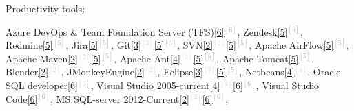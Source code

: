 \begin{cventries}
  \cventry
    {Productivity tools:} %
    {} %
    {} %
    {} %
    {
      \vspace{0.1cm}
      \begin{cvitems} %
        \item[] {        
        \textcolor{rainbowcolor-olive}{Azure DevOps \& Team Foundation Server (TFS)\textcolor{darkgray}{\textcolor{darkgray}{\ref{6}{$^{[6]}$}}}},
        \textcolor{rainbowcolor-olive}{Zendesk\textcolor{darkgray}{\ref{5}{$^{[5]}$}}},
        \textcolor{rainbowcolor-olive}{Redmine\textcolor{darkgray}{\ref{5}{$^{[5]}$}}},
        \textcolor{rainbowcolor-olive}{Jira\textcolor{darkgray}{\ref{5}{$^{[5]}$}}},   
        \textcolor{rainbowcolor-olive}{Git\textcolor{lightgray}{\ref{3}{$^{[3]}$}}\textcolor{darkgray}{\ref{5}{$^{[6]}$}}}, 
        \textcolor{rainbowcolor-olive}{SVN\textcolor{lightgray}{\ref{2}{$^{[2]}$}}\textcolor{darkgray}{\ref{5}{$^{[5]}$}}},
        \textcolor{rainbowcolor-olive}{Apache AirFlow\textcolor{darkgray}{\ref{5}{$^{[5]}$}}},
        \textcolor{rainbowcolor-olive}{Apache Maven\textcolor{lightgray}{\ref{2}{$^{[2]}$}}\textcolor{darkgray}{\ref{5}{$^{[5]}$}}},
        \textcolor{rainbowcolor-olive}{Apache Ant\textcolor{lightgray}{\ref{4}{$^{[4]}$}}\textcolor{darkgray}{\ref{5}{$^{[5]}$}}},  
        \textcolor{rainbowcolor-olive}{Apache Tomcat\textcolor{darkgray}{\ref{5}{$^{[5]}$}}}, 
        \textcolor{rainbowcolor-olive}{Blender\textcolor{lightgray}{\ref{2}{$^{[2]}$}}}, 
        \textcolor{rainbowcolor-olive}{JMonkeyEngine\textcolor{lightgray}{\ref{2}{$^{[2]}$}}}, 
        \textcolor{rainbowcolor-olive}{Eclipse\textcolor{lightgray}{\ref{3}{$^{[3]}$}}\textcolor{darkgray}{\ref{5}{$^{[5]}$}}},  
        \textcolor{rainbowcolor-olive}{Netbeans\textcolor{lightgray}{\ref{4}{$^{[4]}$}}}, 
        \textcolor{rainbowcolor-olive}{Oracle SQL developer\textcolor{darkgray}{\ref{6}{$^{[6]}$}}},
        \textcolor{rainbowcolor-olive}{Visual Studio 2005-current\textcolor{lightgray}{\ref{4}{$^{[4]}$}}\textcolor{darkgray}{\ref{6}{$^{[6]}$}}},
        \textcolor{rainbowcolor-olive}{Visual Studio Code\textcolor{darkgray}{\ref{6}{$^{[6]}$}}},
        \textcolor{rainbowcolor-olive}{MS SQL-server 2012-Current\textcolor{lightgray}{\ref{2}{$^{[2]}$}}\textcolor{darkgray}{\ref{6}{$^{[6]}$}}},
}
\end{cvitems}}
\end{cventries}
